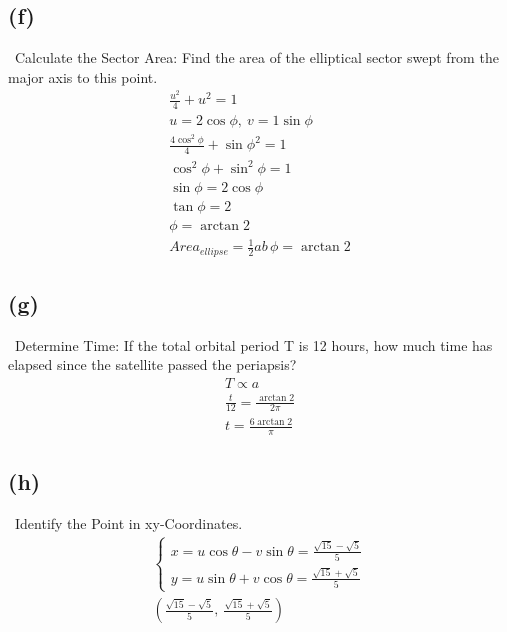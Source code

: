 \documentclass[12pt]{article}
\begin{document}
\subsection{(f)} \, Calculate the Sector Area: Find the area of the elliptical sector swept from the major axis to this point.
\begin{gather*}
    \frac{u^2}{4}+u^2=1\\
    u=2\cos\phi,\ v=1\sin \phi\\
    \frac{4\cos^2\phi}{4}+{\sin\phi}^2=1\\
    \cos^2\phi + \sin^2\phi=1\\
    \sin\phi=2\cos\phi\\
    \tan\phi=2\\
    \phi=\arctan2\\
    \boxed{Area_{ellipse}=\frac{1}{2}ab\,\phi=\arctan2}
\end{gather*}

\subsection{(g)} \, Determine Time: If the total orbital period T is 12 hours, how much time has elapsed since the satellite passed the periapsis?
\begin{gather*}
    T\propto a\\
    \frac{t}{12}=\frac{\arctan2}{2\pi}\\
    \boxed{t=\frac{6\arctan2}{\pi}}
\end{gather*}

\subsection{(h)} \, Identify the Point in xy-Coordinates.
\begin{gather*}
    \begin{cases}
        x=u\cos\theta -v\sin\theta =\frac{\sqrt{15}-\sqrt{5}}{5}\\
        y=u\sin\theta + v\cos\theta = \frac{\sqrt{15}+\sqrt{5}}{5}
    \end{cases}\\
    \boxed{(\frac{\sqrt{15}-\sqrt{5}}{5},\ \frac{\sqrt{15}+\sqrt{5}}{5})}
\end{gather*}
\end{document}
